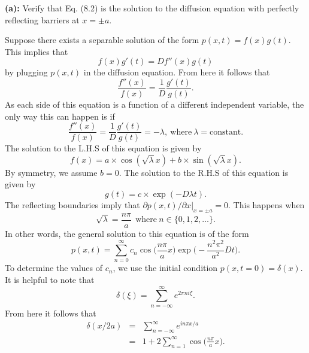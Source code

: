 \textbf{(a):} Verify that Eq. (8.2) is the solution to the diffusion equation with perfectly reflecting barriers at $x=\pm a$.

Suppose there exists a separable solution of the form $p(x,t) = f(x) g(t)$. This implies that
\begin{equation}
f(x) g'(t) = D f''(x) g(t)
\end{equation}
by plugging $p(x, t)$ in the diffusion equation. From here it follows that
\begin{equation}
\frac{f''(x)}{f(x)} = \frac{1}{D} \frac{g'(t)}{g(t)}.
\end{equation}
As each side of this equation is a function of a different independent variable, the only way this can happen is if 
\begin{equation}
\frac{f''(x)}{f(x)} = \frac{1}{D} \frac{g'(t)}{g(t)} = -\lambda,~\text{where}~\lambda=\text{constant}.
\end{equation}
The solution to the L.H.S of this equation is given by
\begin{equation}
f(x) = a \times \cos(\sqrt{\lambda} x) + b \times \sin(\sqrt{\lambda} x).
\end{equation}
By symmetry, we assume $b=0$. The solution to the R.H.S of this equation is given by
\begin{equation}
g(t) = c \times \exp(- D \lambda t).
\end{equation}
The reflecting boundaries imply that $\partial p(x,t)/\partial x |_{x=\pm a} = 0$.  This happens when
\begin{equation}
\sqrt{\lambda} = \frac{n \pi}{a}~~\text{where}~n \in \{0, 1, 2, \ldots\}.
\end{equation}
In other words, the general solution to this equation is of the form
\begin{equation}
p(x,t) = \sum_{n=0}^{\infty} c_n \cos\bigg(\frac{n \pi}{a} x \bigg) \exp\bigg(-\frac{n^2 \pi^2}{a^2} D t \bigg). \label{eq:gen_soln_refl_bound}
\end{equation}
To determine the values of $c_n$, we use the initial condition $p(x, t=0) = \delta(x)$. It is helpful to note that
\begin{equation}
\delta(\xi) = \sum_{n=-\infty}^{\infty} e^{2 \pi n i \xi}. \nonumber
\end{equation}
From here it follows that
\begin{eqnarray}
\delta(x/2a) &=& \sum_{n=-\infty}^{\infty} e^{i n \pi x /a} \nonumber \\
&=& 1 + 2 \sum_{n=1}^{\infty} \cos\bigg(\frac{n \pi}{a} x \bigg).
\end{eqnarray}
